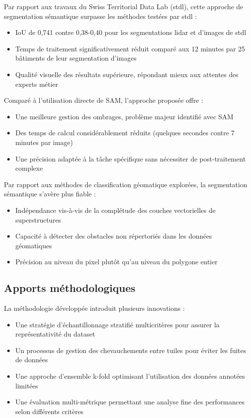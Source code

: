 Par rapport aux travaux du Swiss Territorial Data Lab (\acrshort{stdl}), cette approche de segmentation sémantique surpasse les méthodes testées par \acrshort{stdl} :
\begin{itemize}
    \item IoU de 0,741 contre 0,38-0,40 pour les segmentations \gls{lidar} et d'images de \acrshort{stdl}
    \item Temps de traitement significativement réduit comparé aux 12 minutes par 25 bâtiments de leur segmentation d'images
    \item Qualité visuelle des résultats supérieure, répondant mieux aux attentes des experts métier
\end{itemize}

Comparé à l'utilisation directe de SAM, l'approche proposée offre :
\begin{itemize}
    \item Une meilleure gestion des ombrages, problème majeur identifié avec SAM
    \item Des temps de calcul considérablement réduits (quelques secondes contre 7 minutes par image)
    \item Une précision adaptée à la tâche spécifique sans nécessiter de post-traitement complexe
\end{itemize}

Par rapport aux méthodes de classification géomatique explorées, la segmentation sémantique s'avère plus fiable :
\begin{itemize}
    \item Indépendance vis-à-vis de la complétude des couches vectorielles de superstructures
    \item Capacité à détecter des obstacles non répertoriés dans les données géomatiques
    \item Précision au niveau du pixel plutôt qu'au niveau du polygone entier
\end{itemize}

\subsection{Apports méthodologiques}

La méthodologie développée introduit plusieurs innovations :
\begin{itemize}
    \item Une stratégie d'échantillonnage stratifié multicritères pour assurer la représentativité du dataset
    \item Un processus de gestion des chevauchements entre tuiles pour éviter les fuites de données
    \item Une approche d'ensemble k-fold optimisant l'utilisation des données annotées limitées
    \item Une évaluation multi-métrique permettant une analyse fine des performances selon différents critères
\end{itemize}

